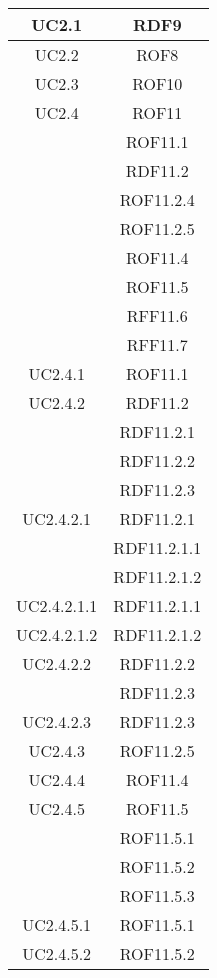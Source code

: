 \begin{longtable}{|c|c|}
\midrule
UC2.1
& RDF9\\

\midrule
UC2.2
& ROF8\\

\midrule
UC2.3
& ROF10\\

\midrule
UC2.4
& ROF11\\
& ROF11.1\\
& RDF11.2\\
& ROF11.2.4\\
& ROF11.2.5\\
& ROF11.4\\
& ROF11.5\\
& RFF11.6\\
& RFF11.7\\

\midrule
UC2.4.1
& ROF11.1\\

\midrule
UC2.4.2
& RDF11.2\\
& RDF11.2.1\\
& RDF11.2.2\\
& RDF11.2.3\\

\midrule
UC2.4.2.1
& RDF11.2.1\\
& RDF11.2.1.1\\
& RDF11.2.1.2\\

\midrule
UC2.4.2.1.1
& RDF11.2.1.1\\

\midrule
UC2.4.2.1.2
& RDF11.2.1.2\\

\midrule
UC2.4.2.2
& RDF11.2.2\\
& RDF11.2.3\\

\midrule
UC2.4.2.3
& RDF11.2.3\\

\midrule
UC2.4.3
& ROF11.2.5\\

\midrule
UC2.4.4
& ROF11.4\\

\midrule
UC2.4.5
& ROF11.5\\
& ROF11.5.1\\
& ROF11.5.2\\
& ROF11.5.3\\

\midrule
UC2.4.5.1
& ROF11.5.1\\

\midrule
UC2.4.5.2
& ROF11.5.2\\


\end{longtable}
